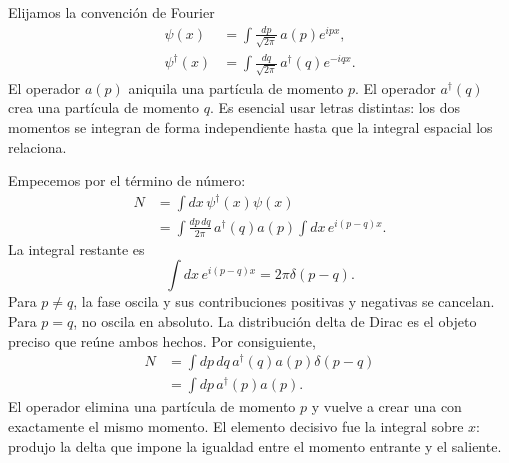 Elijamos la convención de Fourier
\begin{align}
\psi(x)&=\int\frac{dp}{\sqrt{2\pi}}\,a(p)e^{ipx},\\
\psi^\dagger(x)&=\int\frac{dq}{\sqrt{2\pi}}\,a^\dagger(q)e^{-iqx}.
\label{eq:l9-field-fourier}
\end{align}
El operador \(a(p)\) aniquila una partícula de momento \(p\).
El operador \(a^\dagger(q)\) crea una partícula de momento \(q\). Es esencial usar letras distintas: los dos momentos se integran de forma independiente hasta que la integral espacial los relaciona.

Empecemos por el término de número:
\begin{align}
N
&=\int dx\,\psi^\dagger(x)\psi(x)\\
&=\int\frac{dp\,dq}{2\pi}\,
a^\dagger(q)a(p)
\int dx\,e^{i(p-q)x}.
\end{align}
La integral restante es
\begin{equation}
\int dx\,e^{i(p-q)x}=2\pi\delta(p-q).
\end{equation}
Para \(p\ne q\), la fase oscila y sus contribuciones positivas y negativas se cancelan. Para \(p=q\), no oscila en absoluto. La distribución delta de Dirac es el objeto preciso que reúne ambos hechos. Por consiguiente,
\begin{align}
N
&=\int dp\,dq\,a^\dagger(q)a(p)\delta(p-q)\\
&=\int dp\,a^\dagger(p)a(p).
\label{eq:l9-number-momentum}
\end{align}
El operador elimina una partícula de momento \(p\) y vuelve a crear una con exactamente el mismo momento. El elemento decisivo fue la integral sobre \(x\): produjo la delta que impone la igualdad entre el momento entrante y el saliente.

\begin{classroomqa}
\end{classroomqa}

